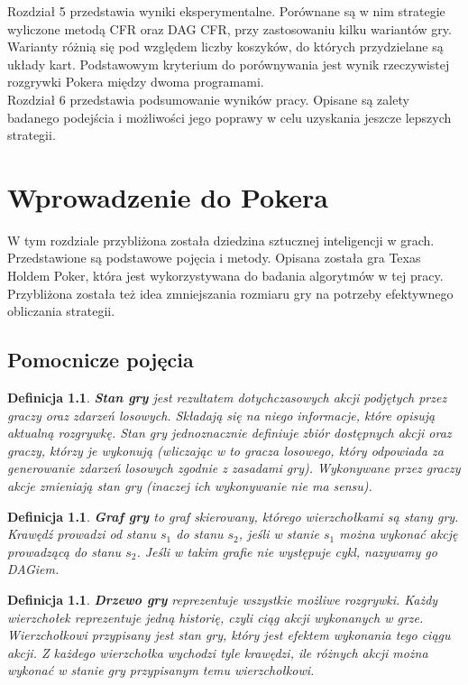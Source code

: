 \documentclass[licencjacka]{pracamgr}
\newtheorem{definition}[theorem]{Definicja}
\begin{document}
\noindent
Rozdział 5 przedstawia wyniki eksperymentalne. Porównane są w nim strategie wyliczone metodą
CFR oraz DAG CFR, przy zastosowaniu kilku wariantów gry. Warianty różnią się pod względem
liczby koszyków, do których przydzielane są układy kart. Podstawowym kryterium
do porównywania jest wynik rzeczywistej rozgrywki Pokera między dwoma programami. \\

\noindent
Rozdział 6 przedstawia podsumowanie wyników pracy. Opisane są zalety badanego podejścia
i możliwości jego poprawy w celu uzyskania jeszcze lepszych strategii.

\chapter{Wprowadzenie do Pokera}

\noindent
W tym rozdziale przybliżona została dziedzina sztucznej inteligencji w grach. Przedstawione
są podstawowe pojęcia i metody. Opisana została gra Texas Holdem Poker, która jest
wykorzystywana do badania algorytmów w tej pracy. Przybliżona została też idea
zmniejszania rozmiaru gry na potrzeby efektywnego obliczania strategii.

\section{Pomocnicze pojęcia}

\begin{definition}
      \textbf{Stan gry} jest rezultatem dotychczasowych akcji podjętych przez graczy oraz zdarzeń losowych.
      Składają się na niego informacje, które opisują aktualną rozgrywkę.
      Stan gry jednoznacznie definiuje zbiór dostępnych
      akcji oraz graczy, którzy je wykonują (wliczając w to gracza losowego, który odpowiada
      za generowanie zdarzeń losowych zgodnie z zasadami gry). Wykonywane przez graczy akcje
      zmieniają stan gry (inaczej ich wykonywanie nie ma sensu).
\end{definition}

\begin{definition}
      \textbf{Graf gry} to graf skierowany, którego wierzchołkami są stany gry. Krawędź prowadzi od stanu
      $s_1$ do stanu $s_2$, jeśli w stanie $s_1$ można wykonać akcję prowadzącą do stanu
      $s_2$. Jeśli w takim grafie nie występuje cykl, nazywamy go DAGiem.
\end{definition}

\begin{definition}
      \textbf{Drzewo gry} reprezentuje wszystkie możliwe rozgrywki. Każdy wierzchołek reprezentuje jedną historię,
      czyli ciąg akcji wykonanych w grze. Wierzchołkowi przypisany jest stan gry, który jest efektem
      wykonania tego ciągu akcji. Z każdego wierzchołka wychodzi tyle krawędzi, ile różnych
      akcji można wykonać w stanie gry przypisanym temu wierzchołkowi.
\end{definition}
\end{document}
